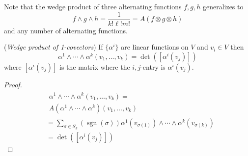 Note that the wedge product of three alternating functions \(f,g,h\) generalizes to 
\begin{equation}
    f \wedge g \wedge h = \frac{1}{k!\ell!m!} = A(f\otimes g \otimes h)
\end{equation}
and any number of alternating functions.

\begin{proposition}
    (\textit{Wedge product of 1-covectors}) If \(\{\alpha^i\}\) are linear functions on \(V\) and \(v_i \in V\) then 
    \begin{equation}
        \alpha^1 \wedge \cdots \wedge \alpha^k (v_1, \dots, v_k) = \det([\alpha^i(v_j)])
    \end{equation}
    where \([\alpha^i(v_j)]\) is the matrix where the \(i,j\)-entry is \(\alpha^i(v_j)\).
\end{proposition}

\begin{proof}
    \begin{align}
        &\begin{multlined}
        \alpha^1 \wedge \cdots \wedge \alpha^k (v_1, \dots, v_k) = \\  A(\alpha^1 \wedge \cdots \wedge \alpha^k) (v_1, \dots, v_k)
        \end{multlined} \\
        &= \sum_{\sigma \in S_k} (\operatorname{sgn}(\sigma)) \alpha^1 (v_{\sigma(1)}) \wedge \cdots \wedge \alpha^k (v_{\sigma(k)}) \\ 
        &= \det([\alpha^i(v_j)])
    \end{align}
\end{proof}